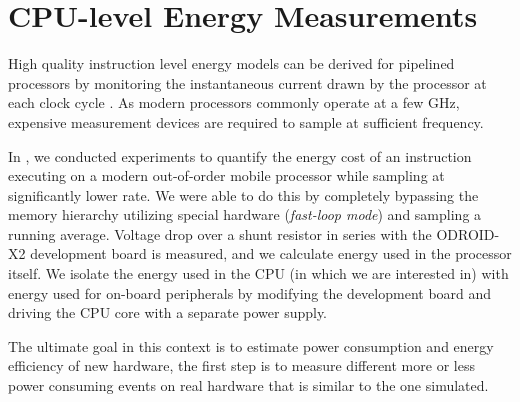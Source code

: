 \section{CPU-level Energy Measurements}

High quality instruction level energy models can be derived for pipelined
processors by monitoring the instantaneous current drawn by the processor at
each clock cycle \cite{nikolaidis2005instruction}. As modern processors commonly
operate at a few GHz, expensive measurement devices are required to sample
at sufficient frequency.

In \cite{rundehvatum2013exploring}, we conducted experiments to quantify the
energy cost of an instruction executing on a modern out-of-order mobile
processor while sampling at significantly lower rate. We were able to do this by
completely bypassing the memory hierarchy utilizing special hardware
(\emph{fast-loop mode}) and sampling a running average. Voltage drop
over a shunt resistor in series with the ODROID-X2 development board is
measured, and we calculate energy used in the processor itself. We isolate
the energy used in the CPU (in which we are interested in) with energy used for
on-board peripherals by modifying the development board and driving the CPU core
with a separate power supply.

The ultimate goal in this context is to estimate power consumption and energy
efficiency of new hardware, the first step is to measure different more or less
power consuming events on real hardware that is similar to the one simulated.

